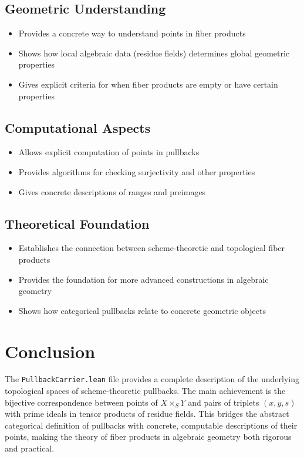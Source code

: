 \documentclass{article}
\theoremstyle{definition}
\begin{document}
\subsection{Geometric Understanding}
\begin{itemize}
\item Provides a concrete way to understand points in fiber products
\item Shows how local algebraic data (residue fields) determines global geometric properties
\item Gives explicit criteria for when fiber products are empty or have certain properties
\end{itemize}

\subsection{Computational Aspects}
\begin{itemize}
\item Allows explicit computation of points in pullbacks
\item Provides algorithms for checking surjectivity and other properties
\item Gives concrete descriptions of ranges and preimages
\end{itemize}

\subsection{Theoretical Foundation}
\begin{itemize}
\item Establishes the connection between scheme-theoretic and topological fiber products
\item Provides the foundation for more advanced constructions in algebraic geometry
\item Shows how categorical pullbacks relate to concrete geometric objects
\end{itemize}

\section{Conclusion}

The \texttt{PullbackCarrier.lean} file provides a complete description of the underlying topological spaces of scheme-theoretic pullbacks. The main achievement is the bijective correspondence between points of $X \times_S Y$ and pairs of triplets $(x, y, s)$ with prime ideals in tensor products of residue fields. This bridges the abstract categorical definition of pullbacks with concrete, computable descriptions of their points, making the theory of fiber products in algebraic geometry both rigorous and practical.
\end{document}
